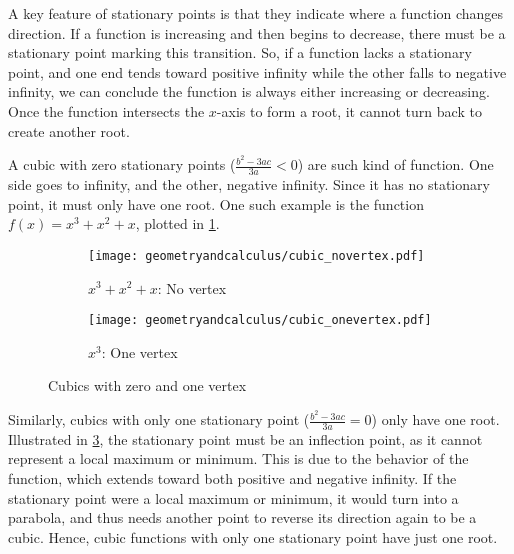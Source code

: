 A key feature of stationary points is that they indicate where a function changes direction. If a function is increasing and then begins to decrease, there must be a stationary point marking this transition. So, if a function lacks a stationary point, and one end tends toward positive infinity while the other falls to negative infinity, we can conclude the function is always either increasing or decreasing. Once the function intersects the $x$-axis to form a root, it cannot turn back to create another root.

A cubic with zero stationary points ($\frac{b^2 - 3ac}{3a} < 0$) are such kind of function. One side goes to infinity, and the other, negative infinity. Since it has no stationary point, it must only have one root. One such example is the function $f(x) = x^3 + x^2 + x$, plotted in \cref{fig:cubic_no_vertex}.

\begin{figure}[t]
	\centering
	\begin{subfigure}[t]{0.3\textwidth}
		\centering
		\texttt{[image: geometryandcalculus/cubic\_novertex.pdf]}
		\caption{$x^3 + x^2 + x$: No vertex}
		\label{fig:cubic_no_vertex}
	\end{subfigure}
	\begin{subfigure}[t]{0.3\textwidth}
		\centering
		\texttt{[image: geometryandcalculus/cubic\_onevertex.pdf]}
		\caption{$x^3$: One vertex}
		\label{fig:cubic_one_vertex}
	\end{subfigure}
	\caption{Cubics with zero and one vertex}
\end{figure}

Similarly, cubics with only one stationary point ($\frac{b^2 - 3ac}{3a} = 0$) only have one root. Illustrated in \cref{fig:cubic_one_vertex}, the stationary point must be an inflection point, as it cannot represent a local maximum or minimum. This is due to the behavior of the function, which extends toward both positive and negative infinity. If the stationary point were a local maximum or minimum, it would turn into a parabola, and thus needs another point to reverse its direction again to be a cubic. Hence, cubic functions with only one stationary point have just one root.

